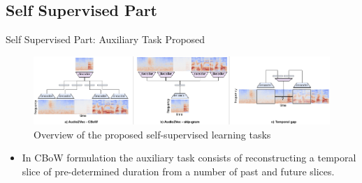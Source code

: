 \documentclass{Beamer}
\begin{document}
\subsection{Self Supervised Part}
\begin{frame}[t]{Self Supervised Part: Auxiliary Task Proposed}


\begin{figure}[h]
\includegraphics[scale=0.60]{Figures/Audio2Vec_Diagram.pdf}
\caption{Overview of the proposed self-supervised learning tasks  \cite{Audio2Vec}}
\end{figure}

\begin{itemize}
\item In CBoW formulation the auxiliary task consists of reconstructing a temporal slice of pre-determined duration from a number of past and future slices.
\end{itemize}

\end{frame}
\end{document}

